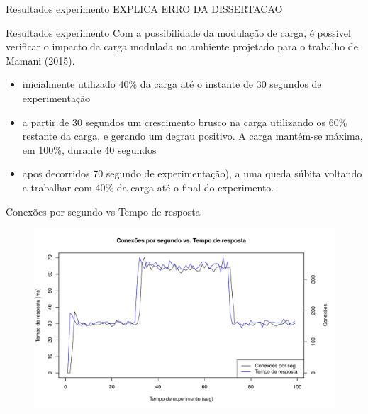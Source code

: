 \begin{frame}{Resultados experimento}
	EXPLICA ERRO DA DISSERTACAO
\end{frame}

\begin{frame}{Resultados experimento}
Com a possibilidade da modulação de carga, é possível verificar o impacto da carga modulada no ambiente projetado para o trabalho de Mamani (2015). 
	\begin{itemize}
		\item inicialmente utilizado 40\% da carga até o instante de 30 segundos de experimentação
	
		\item a partir de 30 segundos um crescimento brusco na carga utilizando os 60\% restante da carga, e gerando um degrau positivo. A carga mantém-se máxima, em 100\%, durante 40 segundos 
	
		\item apos decorridos 70 segundo de experimentação), a uma queda súbita voltando a trabalhar com 40\% da carga até o final do experimento.
	\end{itemize}
\end{frame}

\begin{frame}{Conexões por segundo vs Tempo de resposta}
	\begin{figure}[htb]
		\centering
		\includegraphics[scale=0.5]{../monograph/images/cps-resp60.pdf}	
		\label{fig:cps-resp60}
	\end{figure}
\end{frame}

